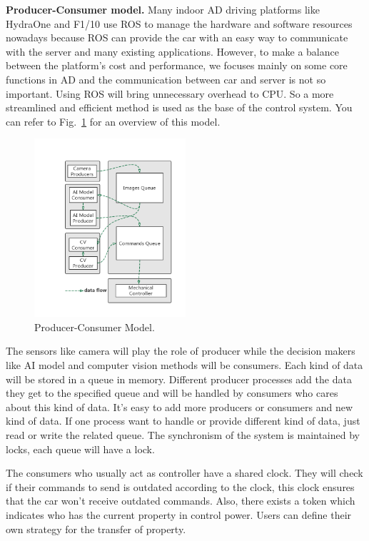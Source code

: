 \documentclass[conference]{IEEEtran}
\begin{document}
\begin{sloppypar}
\textbf{Producer-Consumer model.} Many indoor AD driving platforms like HydraOne\cite{b9} and F1/10\cite{b11} use ROS\cite{b19} to manage the hardware and software resources nowadays because ROS can provide the car with an easy way to communicate with the server and many existing applications. However, to make a balance between the platform's cost and performance, we focuses mainly on some core functions in AD and the communication between car and server is not so important. Using ROS will bring unnecessary overhead to CPU. So a more streamlined and efficient method is used as the base of the control system. You can refer to Fig.~\ref{pcm} for an overview of this model.


\begin{figure}[htbp]
\centerline{\includegraphics[width=0.5\textwidth]{pcm.jpg}}
\caption{Producer-Consumer Model.}
\label{pcm}
\end{figure}

The sensors like camera will play the role of producer while the decision makers like AI model and computer vision methods will be consumers. Each kind of data will be stored in a queue in memory. Different producer processes add the data they get to the specified queue and will be handled by consumers who cares about this kind of data. It's easy to add more producers or consumers and new kind of data. If one process want to handle or provide different kind of data, just read or write the related queue. The synchronism of the system is maintained by locks, each queue will have a lock.

The consumers who usually act as controller have a shared clock. They will check if their commands to send is outdated according to the clock, this clock ensures that the car won't receive outdated commands. Also, there exists a token which indicates who has the current property in control power. Users can define their own strategy for the transfer of property.


\end{sloppypar}
\end{document}
